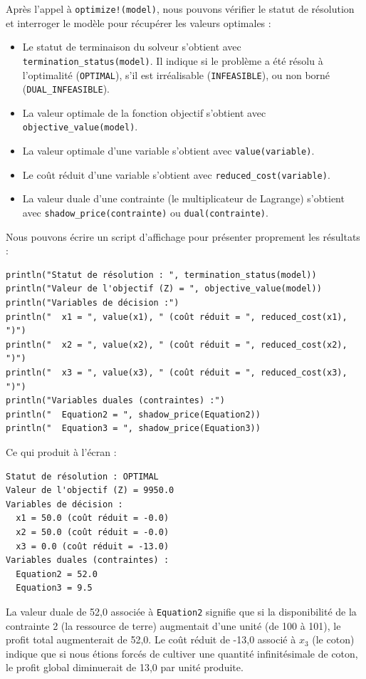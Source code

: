 Après l'appel à \verb|optimize!(model)|, nous pouvons vérifier le statut de résolution et interroger le modèle pour récupérer les valeurs optimales :
\begin{itemize}
\item
Le statut de terminaison du solveur s'obtient avec \verb|termination_status(model)|. Il indique si le problème a été résolu à l'optimalité (\verb|OPTIMAL|), s'il est irréalisable (\verb|INFEASIBLE|), ou non borné (\verb|DUAL_INFEASIBLE|).
\item
La valeur optimale de la fonction objectif s'obtient avec \verb|objective_value(model)|.
\item
La valeur optimale d'une variable s'obtient avec \verb|value(variable)|.
\item
Le coût réduit d'une variable s'obtient avec \verb|reduced_cost(variable)|.
\item
La valeur duale d'une contrainte (le multiplicateur de Lagrange) s'obtient avec \verb|shadow_price(contrainte)| ou \verb|dual(contrainte)|.
\end{itemize}

Nous pouvons écrire un script d'affichage pour présenter proprement les résultats :
\begin{verbatim}
println("Statut de résolution : ", termination_status(model))
println("Valeur de l'objectif (Z) = ", objective_value(model))
println("Variables de décision :")
println("  x1 = ", value(x1), " (coût réduit = ", reduced_cost(x1), ")")
println("  x2 = ", value(x2), " (coût réduit = ", reduced_cost(x2), ")")
println("  x3 = ", value(x3), " (coût réduit = ", reduced_cost(x3), ")")
println("Variables duales (contraintes) :")
println("  Equation2 = ", shadow_price(Equation2))
println("  Equation3 = ", shadow_price(Equation3))
\end{verbatim}
Ce qui produit à l'écran :
\begin{verbatim}
Statut de résolution : OPTIMAL
Valeur de l'objectif (Z) = 9950.0
Variables de décision :
  x1 = 50.0 (coût réduit = -0.0)
  x2 = 50.0 (coût réduit = -0.0)
  x3 = 0.0 (coût réduit = -13.0)
Variables duales (contraintes) :
  Equation2 = 52.0
  Equation3 = 9.5
\end{verbatim}
La valeur duale de 52,0 associée à \verb|Equation2| signifie que si la disponibilité de la contrainte 2 (la ressource de terre) augmentait d'une unité (de 100 à 101), le profit total augmenterait de 52,0. Le coût réduit de -13,0 associé à $x_3$ (le coton) indique que si nous étions forcés de cultiver une quantité infinitésimale de coton, le profit global diminuerait de 13,0 par unité produite.

